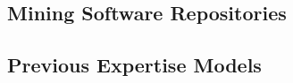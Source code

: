 \label{sec:RevLitt}



\subsection{Mining Software Repositories}




\subsection{Previous Expertise Models}
